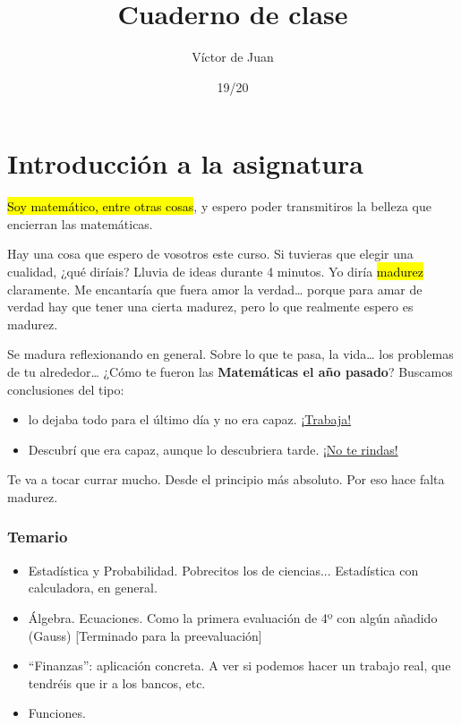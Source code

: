\documentclass[palatino,nosec]{Docencia}
\title{Cuaderno de clase}
\author{Víctor de Juan}
\date{19/20}
\begin{document}
\pagestyle{plain}
\maketitle
\tableofcontents



\chapter{Introducción a la asignatura}


\hl{Soy matemático, entre otras cosas}, y espero poder transmitiros la belleza que encierran las matemáticas.

Hay una cosa que espero de vosotros este curso.
%
Si tuvieras que elegir una cualidad, ¿qué diríais? Lluvia de ideas durante 4 minutos. Yo diría \hl{madurez} claramente. Me encantaría que fuera amor la verdad… porque para amar de verdad hay que tener una cierta madurez, pero lo que realmente espero es madurez.

Se madura reflexionando en general. Sobre lo que te pasa, la vida… los problemas de tu alrededor…  ¿Cómo te fueron las \textbf{Matemáticas el año pasado}? Buscamos conclusiones del tipo: 
\begin{itemize}
	\item lo dejaba todo para el último día y no era capaz. \ul{¡Trabaja!}
	\item Descubrí que era capaz, aunque lo descubriera tarde. \ul{¡No te rindas!}
\end{itemize}

Te va a tocar currar mucho. Desde el principio más absoluto. Por eso hace falta madurez. 

\subsection{Temario}

\begin{itemize}
	\item Estadística y Probabilidad. Pobrecitos los de ciencias... Estadística con calculadora, en general.
	\item Álgebra. Ecuaciones. Como la primera evaluación de 4º con algún añadido (Gauss) [Terminado para la preevaluación]
	\item “Finanzas”: aplicación concreta. A ver si podemos hacer un trabajo real, que tendréis que ir a los bancos, etc. 
	\item Funciones.
\end{itemize}
\end{document}
